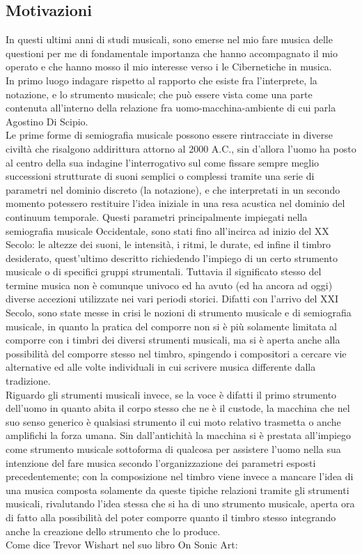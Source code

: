 \subsection{Motivazioni}
\label{Motivazioni}

In questi ultimi anni di studi musicali, sono emerse nel mio fare musica 
delle questioni per me di fondamentale importanza che hanno accompagnato il mio operato
e che hanno mosso il mio interesse verso i le Cibernetiche in musica. \\
In primo luogo indagare rispetto al rapporto che esiste fra l'interprete, la notazione, e lo strumento musicale;
che può essere vista come una parte contenuta all'interno della relazione fra uomo-macchina-ambiente di cui parla
Agostino Di Scipio. \\
Le prime forme di semiografia musicale possono essere rintracciate in diverse civiltà 
che risalgono addirittura attorno al 2000 A.C.,
sin d'allora l'uomo ha posto al centro della sua indagine l'interrogativo sul come fissare sempre meglio 
successioni strutturate di suoni semplici o complessi tramite una serie di parametri nel dominio discreto (la notazione), 
e che interpretati in un secondo momento potessero restituire l'idea iniziale in una resa 
acustica nel dominio del continuum temporale.
Questi parametri principalmente impiegati nella semiografia musicale Occidentale, 
sono stati fino all'incirca ad inizio del XX Secolo: 
le altezze dei suoni, le intensità, i ritmi, le durate, ed infine il timbro desiderato, 
quest'ultimo descritto richiedendo l'impiego di un certo strumento musicale o di specifici gruppi strumentali.
Tuttavia il significato stesso del termine musica non è comunque univoco ed ha avuto (ed ha ancora ad oggi) 
diverse accezioni utilizzate nei vari periodi storici.
Difatti con l'arrivo del XXI Secolo, sono state messe in crisi le nozioni di strumento musicale e di semiografia musicale, 
in quanto la pratica del comporre non si è più solamente limitata al comporre 
con i timbri dei diversi strumenti musicali, ma si è aperta anche alla possibilità del comporre stesso nel timbro, 
spingendo i compositori a cercare vie alternative ed alle volte individuali in cui scrivere musica differente dalla tradizione.\\
Riguardo gli strumenti musicali invece, se la voce è difatti il primo strumento dell'uomo in quanto 
abita il corpo stesso che ne è il custode, la macchina che nel suo senso generico è qualsiasi strumento 
il cui moto relativo trasmetta o anche amplifichi la forza umana.
Sin dall'antichità la macchina si è prestata all'impiego come strumento musicale sottoforma di qualcosa per assistere l'uomo nella 
sua intenzione del fare musica secondo l'organizzazione dei parametri esposti precedentemente; 
con la composizione nel timbro viene invece a mancare l'idea 
di una musica composta solamente da queste tipiche relazioni tramite gli strumenti musicali, 
rivalutando l'idea stessa che si ha di uno strumento musicale, aperta ora di fatto alla possibilità 
del poter comporre quanto il timbro stesso integrando anche la creazione dello strumento che lo produce. \\
Come dice Trevor Wishart nel suo libro On Sonic Art:

